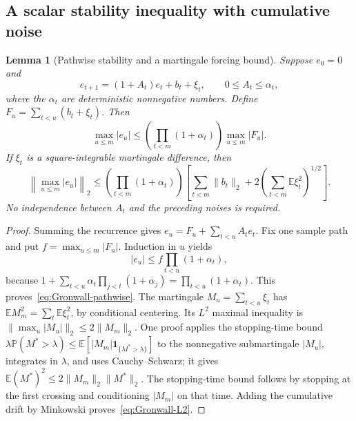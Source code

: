 \documentclass[11pt]{article}
\newtheorem{lemma}[theorem]{Lemma}
\theoremstyle{definition}\newtheorem{definition}[theorem]{Definition}
\theoremstyle{remark}\newtheorem{remark}[theorem]{Remark}
\newcommand{\E}{\mathbb E}
\newcommand{\PP}{\mathbb P}
\newcommand{\one}{\mathbf1}
\begin{document}
\subsection{A scalar stability inequality with cumulative noise}
\begin{lemma}[Pathwise stability and a martingale forcing bound]\label{lem:scalar-Gronwall}
Suppose $e_0=0$ and
\[
 e_{t+1}=(1+A_t)e_t+b_t+\xi_t,
 \qquad 0\le A_t\le\alpha_t,
\]
where the $\alpha_t$ are deterministic nonnegative numbers. Define
$F_u=\sum_{t<u}(b_t+\xi_t)$. Then
\begin{equation}\label{eq:Gronwall-pathwise}
 \max_{u\le m}|e_u|
 \le\left(\prod_{t<m}(1+\alpha_t)\right)\max_{u\le m}|F_u|.
\end{equation}
If $\xi_t$ is a square-integrable martingale difference, then
\begin{equation}\label{eq:Gronwall-L2}
 \left\|\max_{u\le m}|e_u|\right\|_2
 \le\left(\prod_{t<m}(1+\alpha_t)\right)
 \left[\sum_{t<m}\|b_t\|_2+
 2\left(\sum_{t<m}\E\xi_t^2\right)^{1/2}\right].
\end{equation}
No independence between $A_t$ and the preceding noises is required.
\end{lemma}
\begin{proof}
Summing the recurrence gives
$e_u=F_u+\sum_{t<u}A_te_t$. Fix one sample path and put
$f=\max_{u\le m}|F_u|$. Induction in $u$ yields
\[
 |e_u|\le f\prod_{t<u}(1+\alpha_t),
\]
because $1+\sum_{t<u}\alpha_t\prod_{j<t}(1+\alpha_j)=\prod_{t<u}(1+\alpha_t)$. This proves~\eqref{eq:Gronwall-pathwise}. The martingale $M_u=\sum_{t<u}\xi_t$ has
$\E M_m^2=\sum_t\E\xi_t^2$, by conditional centering. Its $L^2$ maximal inequality is
$\|\max_u|M_u|\|_2\le2\|M_m\|_2$. One proof applies the stopping-time bound
$\lambda\PP(M^*>\lambda)\le\E[|M_m|\one_{\{M^*>\lambda\}}]$
to the nonnegative submartingale $|M_u|$, integrates in $\lambda$, and uses Cauchy--Schwarz; it gives $\E(M^*)^2\le2\|M_m\|_2\|M^*\|_2$. The stopping-time bound follows by stopping at the first crossing and conditioning $|M_m|$ on that time. Adding the cumulative drift by Minkowski proves~\eqref{eq:Gronwall-L2}.
\end{proof}
\end{document}
